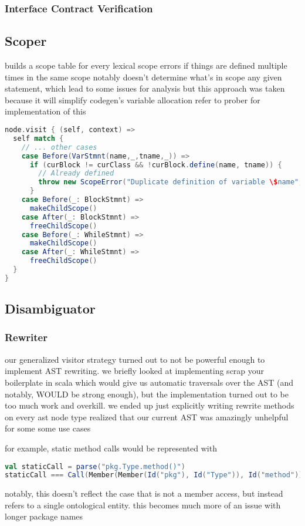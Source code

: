 \documentclass{article}
\begin{document}
\subsubsection{Interface Contract Verification}




\subsection{Scoper}
builds a scope table for every lexical scope
errors if things are defined multiple times in the same scope
notably doesn't determine what's in scope any given statement, which lead to some issues for analysis
but this approach was taken because it will simplify codegen's variable allocation
    refer to prober for implementation of this


\begin{lstlisting}[language=Scala]
node.visit { (self, context) =>
  self match {
    // ... other cases
    case Before(VarStmnt(name,_,tname,_)) =>
      if (curBlock != curClass && !curBlock.define(name, tname)) {
        // Already defined
        throw new ScopeError("Duplicate definition of variable \$name", self.from)
      }
    case Before(_: BlockStmnt) =>
      makeChildScope()
    case After(_: BlockStmnt) =>
      freeChildScope()
    case Before(_: WhileStmnt) =>
      makeChildScope()
    case After(_: WhileStmnt) =>
      freeChildScope()
  }
}
\end{lstlisting}



\subsection{Disambiguator}
\subsubsection{Rewriter}
our generalized visitor strategy turned out to not be powerful enough to implement AST rewriting.
we briefly looked at implementing scrap your boilerplate in scala which would give us automatic traversals
over the AST (and notably, WOULD be strong enough), but the implementation turned out to be too much work
and overkill. we ended up just explicitly writing rewrite methods on every ast node type
realized that our current AST was amazingly unhelpful for some some use cases

for example, static method calls would be represented with
\begin{lstlisting}[language=Scala]
val staticCall = parse("pkg.Type.method()")
staticCall === Call(Member(Member(Id("pkg"), Id("Type")), Id("method")))
\end{lstlisting}
notably, this doesn't reflect the case that  is not a member access, but instead
refers to a single ontological entity. this becomes much more of an issue with longer package names
\end{document}
